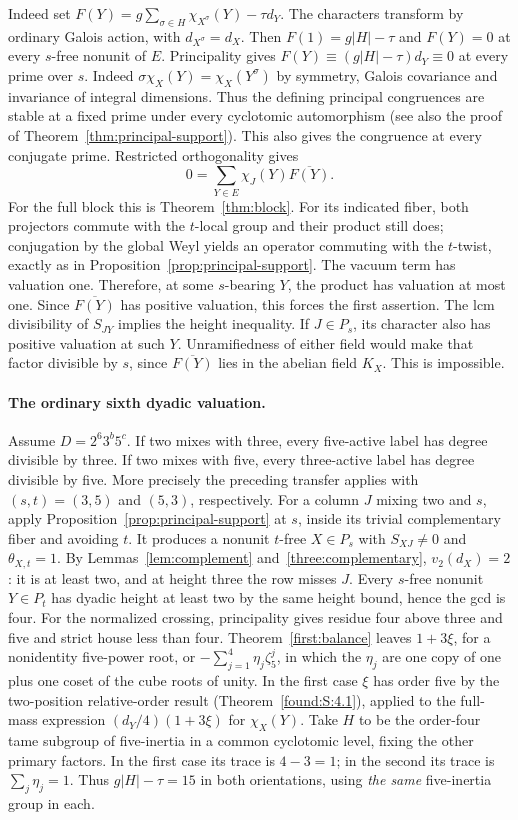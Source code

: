 \documentclass[11pt,a4paper]{article}
\numberwithin{equation}{section}
\theoremstyle{remark}
\begin{document}
Indeed set $F(Y)=g\sum_{\sigma\in H}\chi_{X^\sigma}(Y)-\tau d_Y$.
The characters transform by ordinary Galois action, with $d_{X^\sigma}=d_X$.
Then $F(1)=g|H|-\tau$ and $F(Y)=0$ at every $s$-free nonunit of $E$.
Principality gives $F(Y)\equiv(g|H|-\tau)d_Y\equiv0$ at every prime over
$s$. Indeed $\sigma\chi_X(Y)=\chi_X(Y^\sigma)$ by symmetry, Galois covariance
and invariance of integral dimensions. Thus the defining principal congruences
are stable at a fixed prime under every cyclotomic automorphism (see also the proof of Theorem~\ref{thm:principal-support}). This also gives the congruence at every conjugate prime.
Restricted orthogonality gives
\[
 0=\sum_{Y\in E}\chi_J(Y)\overline{F(Y)}.
\]
For the full block this is Theorem~\ref{thm:block}. For its indicated fiber, both
projectors commute with the $t$-local group and their product still does;
conjugation by the global Weyl yields an operator commuting with the
$t$-twist, exactly as in Proposition~\ref{prop:principal-support}. The vacuum term has valuation
one. Therefore, at some $s$-bearing $Y$, the product has valuation at most
one. Since $\overline{F(Y)}$ has positive valuation, this forces the first
assertion. The lcm divisibility of $S_{JY}$ implies the height inequality.
If $J\in P_s$, its character also has positive valuation at such $Y$.
Unramifiedness of either field would make that factor divisible by $s$,
since $\overline{F(Y)}$ lies in the abelian field $K_X$. This is impossible.

\paragraph{The ordinary sixth dyadic valuation.}
Assume $D=2^6 3^b5^c$. If two mixes with three, every five-active label
has degree divisible by three. If two mixes with five, every three-active
label has degree divisible by five. More precisely the preceding transfer
applies with $(s,t)=(3,5)$ and $(5,3)$, respectively.
For a column $J$ mixing two and $s$, apply Proposition~\ref{prop:principal-support} at $s$,
inside its trivial complementary fiber and avoiding $t$. It produces a
nonunit $t$-free $X\in P_s$ with $S_{XJ}\ne0$ and $\theta_{X,t}=1$.
By Lemmas~\ref{lem:complement} and~\ref{three:complementary}, $v_2(d_X)=2$: it is at least two, and at
height three the row misses $J$. Every $s$-free nonunit $Y\in P_t$ has
dyadic height at least two by the same height bound, hence the gcd is
four. For the normalized crossing, principality gives residue four above
three and five and strict house less than four. Theorem~\ref{first:balance} leaves
$1+3\xi$, for a nonidentity five-power root, or
$-\sum_{j=1}^4\eta_j\zeta_5^j$, in which the $\eta_j$ are one copy of
one plus one coset of the cube roots of unity. In the first case $\xi$
has order five by the two-position relative-order result (Theorem~\ref{found:S:4.1}),
applied to the full-mass expression $(d_Y/4)(1+3\xi)$ for $\chi_X(Y)$.
Take $H$ to be the order-four tame subgroup of five-inertia in a common
cyclotomic level, fixing the other primary factors. In the first case
its trace is $4-3=1$; in the second its trace is $\sum_j\eta_j=1$.
Thus $g|H|-\tau=15$ in both orientations, using \emph{the same}
five-inertia group in each.
\end{document}
